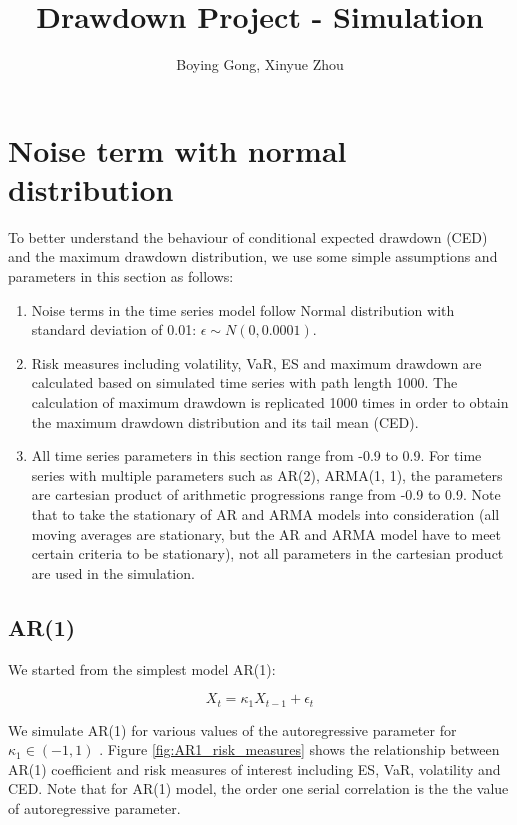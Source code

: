 \documentclass[11pt]{article}
\title{Drawdown Project - Simulation}
\author{Boying Gong, Xinyue Zhou}
\begin{document}
\maketitle

\tableofcontents

\clearpage

\section{Noise term with normal distribution}

To better understand the behaviour of conditional expected drawdown (CED) and the maximum drawdown distribution, we use some simple assumptions and parameters in this section as follows:

\begin{enumerate}
\item Noise terms in the time series model follow Normal distribution with standard deviation of 0.01: $\epsilon \sim N(0, 0.0001)$.
\item Risk measures including volatility, VaR, ES and maximum drawdown are calculated based on simulated time series with path length 1000. The calculation of maximum drawdown is replicated 1000 times in order to obtain the maximum drawdown distribution and its tail mean (CED).
\item All time series parameters in this section range from -0.9 to 0.9. For time series with multiple parameters such as AR(2), ARMA(1, 1), the parameters are cartesian product of arithmetic progressions range from -0.9 to 0.9. Note that to take the stationary of AR and ARMA models into consideration (all moving averages are stationary, but the AR and ARMA model have to meet certain criteria to be stationary), not all parameters in the cartesian product are used in the simulation.
\end{enumerate}

\subsection{AR(1)} %

We started from the simplest model AR(1):

\begin{equation}
X_t = \kappa_1X_{t-1} + \epsilon_t
\end{equation}

We simulate AR(1) for various values of the autoregressive parameter for $\kappa_1 \in (-1, 1)$ . Figure \ref{fig:AR1_risk_measures} shows the relationship between AR(1) coefficient and risk measures of interest including ES, VaR, volatility and CED. Note that for AR(1) model, the order one serial correlation is the the value of autoregressive parameter.
\end{document}
